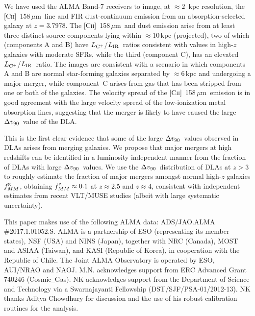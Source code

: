 \documentclass[twocolumn]{aastex62}
\newcommand{\cplus}{[\ctwo]~158\,$\mu$m}
\newcommand{\zcube}{3.7978}
\newcommand{\rsep}{6}  %
\newcommand{\mdvninety}{\Delta v_{\rm 90}}
\newcommand{\dvninety}{$\mdvninety$}
\newcommand{\mfmg}{f_{MM}^{\rm g}}    %
\newcommand{\mldust}{L_{\rm IR}}  %
\newcommand{\ldust}{$\mldust$}
\newcommand{\mlcplus}{L_{\rm C^+}}   %
\newcommand{\lcplus}{$\mlcplus$}
\newcommand{\ctwo}{C\textsc{ii}}
\begin{document}
We have used the ALMA Band-7 receivers to image, at $\approx 2$~kpc resolution, the \cplus\ line 
and FIR dust-continuum emission from an absorption-selected galaxy at $z = \zcube$. 
The \cplus\ and dust emission arise from at least three distinct source components 
lying within $\approx 10$\,kpc (projected), two of which (components A and B) have 
\lcplus/\ldust\ ratios consistent with values
in high-$z$ galaxies with moderate SFRs, while the third (component C), 
has an elevated \lcplus/\ldust\ 
ratio. The images are consistent with a scenario in which components A and B are 
normal star-forming 
galaxies separated by $\approx \rsep$\,kpc and undergoing a major merger, while 
component~C arises from 
gas that has been stripped from one or both of the galaxies. 
The velocity spread of the \cplus\ emission 
is in good agreement with the large velocity spread of the low-ionization metal absorption 
lines, suggesting that the merger is likely to have caused the large \dvninety\ value of the DLA. 

This is the first clear evidence that some of the large \dvninety\ values observed in DLAs arises from merging
galaxies. We propose that major mergers at high redshifts can be identified in a luminosity-independent
manner from the fraction of DLAs with large \dvninety\ values. We use the \dvninety\ distribution 
of DLAs at $z > 3$ to roughly estimate the fraction of major mergers 
amongst normal high-$z$ galaxies $\mfmg$, 
obtaining $\mfmg \approx 0.1$ at $z\approx 2.5$ and $z \approx 4$, 
consistent with independent estimates 
from recent VLT/MUSE studies (albeit with large systematic uncertainty).


\acknowledgments
This paper makes use of the following ALMA data: ADS/JAO.ALMA \#2017.1.01052.S. ALMA 
is a partnership of ESO (representing its member states), NSF (USA) and NINS (Japan), 
together with NRC (Canada), MOST and ASIAA (Taiwan), and KASI (Republic of Korea), in 
cooperation with the Republic of Chile. The Joint ALMA Observatory is operated by ESO, 
AUI/NRAO and NAOJ. M.N. acknowledges support from ERC Advanced Grant 740246 (Cosmic{\verb|_|}Gas). 
NK acknowledges support from the Department of Science and Technology via a Swarnajayanti 
Fellowship (DST/SJF/PSA-01/2012-13). NK thanks Aditya Chowdhury for discussion and the use of 
his robust calibration routines for the analysis.





\end{document}
